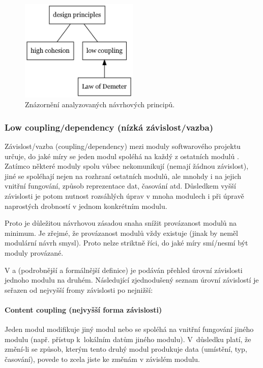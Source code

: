 \begin{figure}[h!]
  \centering
  \includegraphics[width=0.5\textwidth]{./graphs/oop_design_principles.png}
  \caption{Znázornění analyzovaných návrhových principů.\label{analyzed_principles}}
\end{figure}


\subsubsection{Low coupling/dependency (nízká závislost/vazba)}
Závislost/vazba (coupling/dependency) mezi moduly softwarového projektu určuje, do jaké míry se jeden modul spoléhá na každý z ostatních modulů \cite{wiki:coupling}. Zatímco některé moduly spolu vůbec nekomunikují (nemají žádnou závislost), jiné se spoléhají nejen na rozhraní ostatních modulů, ale mnohdy i na jejich vnitřní fungování, způsob reprezentace dat, časování atd. Důsledkem vyšší závislosti je potom nutnost rozsáhlých úprav v mnoha modulech i při úpravě naprostých drobností v jednom konkrétním modulu.

Proto je důležitou návrhovou zásadou snaha snížit provázanost modulů na minimum. Je zřejmé, že provázanost modulů vždy existuje (jinak by neměl modulární návrh smysl). Proto nelze striktně říci, do jaké míry smí/nesmí být moduly provázané.

V \cite{wiki:coupling} a \cite{STVR:STVR162} (podrobnější a formálnější definice) je podáván přehled úrovní závislosti jednoho modulu na druhém. Následující zjednodušený seznam úrovní závislostí je seřazen od nejvyšší fromy závislosti po nejnižší:

\paragraph{Content coupling (nejvyšší forma závislosti)} Jeden modul modifikuje jiný modul nebo se spoléhá na vnitřní fungování jiného modulu (např. přístup k~lokálním datům jiného modulu). V~důsledku platí, že změní-li se způsob, kterým tento druhý modul produkuje data (umístění, typ, časování), povede to zcela jiste ke změnám v závislém modulu.

